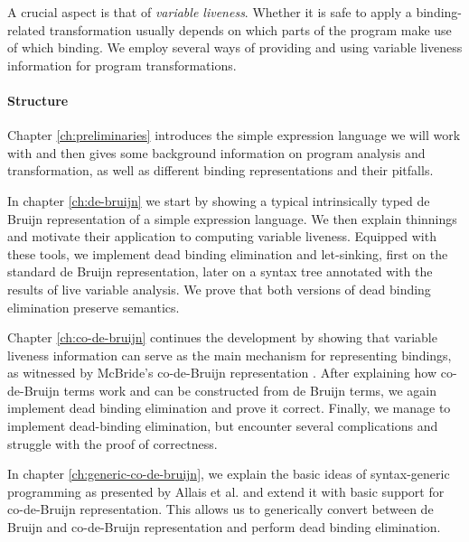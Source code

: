     A crucial aspect is that of \emph{variable liveness}.
    Whether it is safe to apply a binding-related transformation
    usually depends on which parts of the program make use of which binding.
    We employ several ways of providing and using variable liveness information
    for program transformations.

  \paragraph{Structure}
    Chapter \ref{ch:preliminaries}
    introduces the simple expression language we will work with
    and then gives some background information on program analysis and transformation,
    as well as different binding representations and their pitfalls.

    In chapter \ref{ch:de-bruijn} we start by
    showing a typical intrinsically typed de Bruijn representation of a simple expression language.
    We then explain thinnings and motivate their application to computing variable liveness.
    Equipped with these tools,
    we implement dead binding elimination and let-sinking,
    first on the standard de Bruijn representation,
    later on a syntax tree annotated with the results of live variable analysis.
    We prove that both versions of dead binding elimination preserve semantics.

    Chapter \ref{ch:co-de-bruijn} continues the development by showing that variable liveness information
    can serve as the main mechanism for representing bindings, as witnessed by
    McBride's co-de-Bruijn representation
    \cite{McBride2018EveryBodysGotToBeSomewhere}.
    After explaining how co-de-Bruijn terms work and can be constructed from de Bruijn terms,
    we again implement dead binding elimination and prove it correct.
    Finally, we manage to implement dead-binding elimination, but encounter several complications
    and struggle with the proof of correctness.

    In chapter \ref{ch:generic-co-de-bruijn}, we explain the basic ideas of syntax-generic programming
    as presented by Allais et al.
    \cite{Allais2018UniverseOfSyntaxes}
    and extend it with basic support for co-de-Bruijn representation.
    This allows us to generically convert between de Bruijn and co-de-Bruijn representation
    and perform dead binding elimination.

